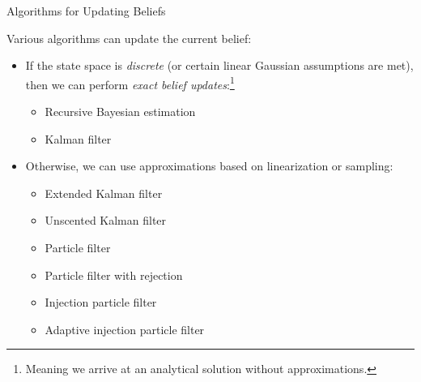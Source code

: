 
\begin{frame}{Algorithms for Updating Beliefs}

Various algorithms can update the current belief:
\begin{itemize}
    \item If the state space is \textit{discrete} (or certain linear Gaussian assumptions are met), then we can perform \textit{exact belief updates}:\footnote{Meaning we arrive at an analytical solution without approximations.}
    \begin{itemize}
        \item Recursive Bayesian estimation
        \item Kalman filter
    \end{itemize}
    \item Otherwise, we can use approximations based on linearization or sampling:
    \begin{itemize}
        \item Extended Kalman filter
        \item Unscented Kalman filter
        \item Particle filter
        \item Particle filter with rejection
        \item Injection particle filter
        \item Adaptive injection particle filter
    \end{itemize}
\end{itemize}

\end{frame}